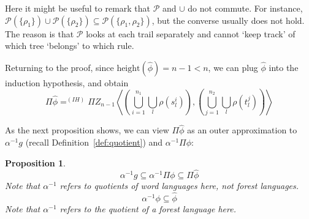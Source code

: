 \documentclass[sigplan,9pt]{acmart}\settopmatter{printfolios=true,printccs=false,printacmref=false}
\newcounter{thm}
\newcounter{theorem}
\theoremstyle{definition}
\newtheorem{prop}[thm]{Proposition}
\newcommand{\La}[0]{{\mathcal{L}}}
\newcommand{\Pa}[0]{{\mathcal{P}}}
\newcommand{\height}[0]{\text{height}}
\begin{document}
Here it might be useful to remark that $\Pa$ and $\cup$ do not commute. For instance, $\Pa(\{\rho_1\}) \cup \Pa(\{\rho_2\}) \subseteq \Pa(\{\rho_1, \rho_2\})$, but the converse usually does not hold. The reason is that $\Pa$ looks at each trail separately and cannot `keep track' of which tree `belongs' to which rule.

Returning to the proof, since $\height(\widehat{\phi}) = n-1 < n$, we can plug $\widehat{\phi}$ into the induction hypothesis, and obtain
\begin{equation}\label{ex:ih}
\Pi\widehat{\phi} =^{(IH)} \Pi  Z_{n-1} \left\langle \left(\bigcup_{i=1}^{n_1} \bigcup_l \rho(s^i_l)\right) ,\left(\bigcup_{j=1}^{n_2} \bigcup_l \rho(t^j_l)\right)\right\rangle 
\end{equation}





As the next proposition shows, we can view $\Pi \widehat{\phi}$ as an outer approximation to $\alpha^{-1} g$ (recall Definition~\ref{def:quotient}) and $\alpha^{-1} \Pi \phi$:

\begin{prop}\label{obs:phi-phi-hat}
$$\alpha^{-1} g \subseteq \alpha^{-1} \Pi \phi \subseteq \Pi \widehat{\phi}$$
\emph{Note that $\alpha^{-1}$ refers to quotients of word languages here, not forest languages.}
$$\alpha^{-1} \phi \subseteq \widehat{\phi}$$
\emph{Note that $\alpha^{-1}$ refers to the quotient of a forest language here.}
\end{prop}

\end{document}
